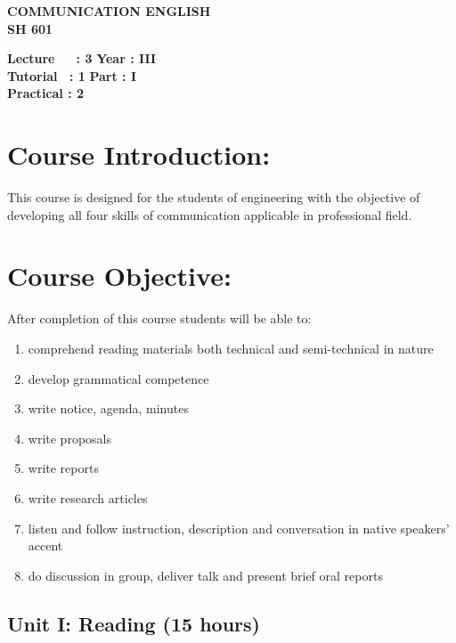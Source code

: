 \begin{center}
    \textbf{\huge{\uppercase{Communication English}}}
    \\
    \vspace{.5cm}
    \textbf{\large{SH 601}}
\end{center}

\noindent\textbf{Lecture\ \ \ : 3} \hfill \textbf{Year : III} \\
\textbf{Tutorial \ : 1} \hfill \textbf{Part : I } \\
\textbf{Practical : 2}  \\

\par
\noindent 
\section*{Course Introduction:}
This course is designed for the students of engineering with the objective of developing all four skills of communication applicable in professional field.

\section*{Course Objective:}
After completion of this course students will be able to:
\begin{enumerate}[label=\alph*.]
    \item comprehend reading materials both technical and semi-technical in nature
    \item develop grammatical competence
    \item write notice, agenda, minutes
    \item write proposals
    \item write reports
    \item write research articles
    \item listen and follow instruction, description and conversation in native speakers' accent
    \item do discussion in group, deliver talk and present brief oral reports
\end{enumerate}


\subsection*{Unit I: Reading \hfill (15 hours)}


